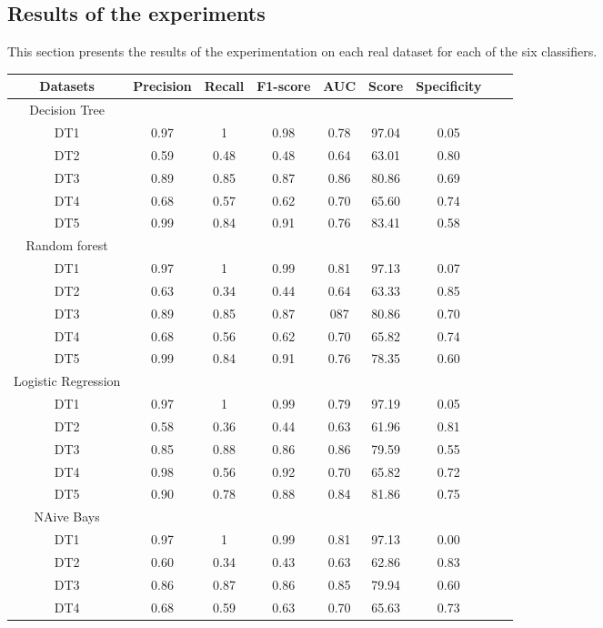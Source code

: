 \subsection{Results of the experiments}

This section presents the results of the experimentation on each real dataset for each of the six classifiers. 


\begin{table}[!ht]
\begin{tabular}{*{7}{c}l r}
  \toprule
  \textbf{Datasets} & \textbf{Precision} & \textbf{Recall} & \textbf{F1-score}&\textbf{AUC} &\textbf{Score}&\textbf{Specificity}\\
   \midrule
Decision Tree& & & & & &  \\
  DT1 &0.97  & 1   & 0.98 & 0.78 & 97.04 & 0.05 \\
  DT2 & 0.59 &0.48 &0.48  &0.64  &63.01  &0.80\\
  DT3 &0.89  &0.85 &0.87  &0.86  &80.86  &0.69\\
  DT4 &0.68  &0.57 &0.62  &0.70  &65.60  &0.74\\
  DT5 &0.99  &0.84 &0.91  &0.76  &83.41  &0.58\\
   \hline
Random forest & & & & & &  \\
     DT1 &0.97 &1   &0.99 &0.81 &97.13& 0.07\\
  DT2 &0.63  & 0.34  &0.44&0.64&63.33& 0.85\\
  DT3 &0.89 &0.85 &0.87&087&80.86&0.70\\
  DT4 &0.68 &0.56&0.62&0.70&65.82&0.74\\
  DT5 &0.99 &0.84&0.91&0.76&78.35&0.60\\
   \hline
Logistic Regression  & & & & & &  \\
 DT1 &0.97 &1   &0.99 &0.79 &97.19&0.05 \\
  DT2 & 0.58 &0.36   &0.44&0.63&61.96&0.81\\
  DT3 &0.85 &0.88 &0.86&0.86&79.59&0.55\\
  DT4 &0.98 &0.56&0.92&0.70&65.82&0.72\\
  DT5 & 0.90&0.78&0.88&0.84&81.86&0.75\\
   \hline
NAive Bays  & & & & & &  \\  
 DT1 &0.97 &1   &0.99 &0.81 &97.13 &0.00\\
  DT2 & 0.60 &0.34   &0.43&0.63&62.86&0.83 \\
  DT3 &0.86 &0.87 &0.86&0.85&79.94&0.60\\
  DT4 &0.68 &0.59&0.63&0.70&65.63&0.73\\

\end{tabular}
\end{table}
